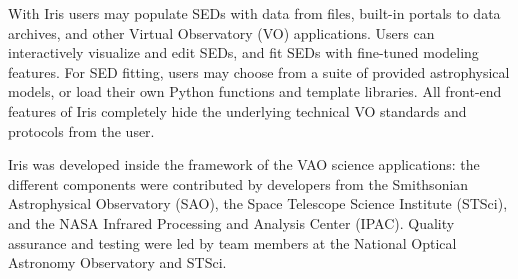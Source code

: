 \documentclass[final,5p,authoryear]{elsarticle}
\begin{document}
With Iris users may populate SEDs with data from files, built-in portals to data
archives, and other Virtual Observatory (VO) applications. Users can
interactively visualize and edit SEDs, and fit SEDs with fine-tuned modeling
features. For SED fitting, users may choose from a suite of provided astrophysical models, or
load their own Python functions and template libraries. All front-end features
of Iris completely hide the underlying technical VO standards and protocols from
the user.




Iris was developed inside the framework of the VAO science applications: the
different components were contributed by developers from the Smithsonian
Astrophysical Observatory (SAO), the Space Telescope Science Institute (STSci), and the NASA
Infrared Processing and Analysis Center (IPAC). Quality assurance and testing were led
by team members at the National Optical Astronomy Observatory and STSci.
\end{document}
